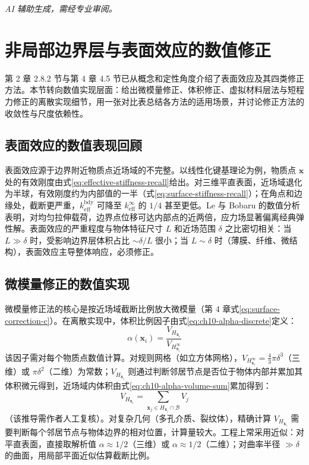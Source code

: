 \emph{AI 辅助生成，需经专业审阅。}


\section{非局部边界层与表面效应的数值修正}

第 2 章 2.8.2 节与第 4 章 4.5 节已从概念和定性角度介绍了表面效应及其四类修正方法。本节转向数值实现层面：给出微模量修正、体积修正、虚拟材料层法与短程力修正的离散实现细节，用一张对比表总结各方法的适用场景，并讨论修正方法的收敛性与尺度依赖性。

\subsection{表面效应的数值表现回顾}

表面效应源于边界附近物质点近场域的不完整。以线性化键基理论为例，物质点 $\mathbf{x}$ 处的有效刚度由式\eqref{eq:effective-stiffness-recall}给出。对三维平直表面，近场域退化为半球，有效刚度约为内部值的一半（式\eqref{eq:surface-stiffness-recall}）；在角点和边缘处，截断更严重，$k_{\text{eff}}^{\text{bdy}}$ 可降至 $k_{\text{eff}}^{\infty}$ 的 $1/4$ 甚至更低。Le 与 Bobaru \cite{LeBobaru2018} 的数值分析表明，对均匀拉伸载荷，边界点位移可达内部点的近两倍，应力场显著偏离经典弹性解。表面效应的严重程度与物体特征尺寸 $L$ 和近场范围 $\delta$ 之比密切相关：当 $L\gg\delta$ 时，受影响边界层体积占比 $\sim\delta/L$ 很小；当 $L\sim\delta$ 时（薄膜、纤维、微结构），表面效应主导整体响应，必须修正。

\subsection{微模量修正的数值实现}

微模量修正法的核心是按近场域截断比例放大微模量（第 4 章式\eqref{eq:surface-correction-c}）。在离散实现中，体积比例因子由式\eqref{eq:ch10-alpha-discrete}定义：
\begin{equation}
\alpha(\mathbf{x}_{i}) = \frac{V_{H_{\mathbf{x}_{i}}}}{V_{H_{\mathbf{x}_{i}}^{\infty}}}
\label{eq:ch10-alpha-discrete}
\end{equation}
该因子需对每个物质点数值计算。对规则网格（如立方体网格），$V_{H_{\mathbf{x}_{i}}^{\infty}}=\frac{4}{3}\pi\delta^{3}$（三维）或 $\pi\delta^{2}$（二维）为常数；$V_{H_{\mathbf{x}_{i}}}$ 则通过判断邻居节点是否位于物体内部并累加其体积微元得到，近场域内体积由式\eqref{eq:ch10-alpha-volume-sum}累加得到：
\begin{equation}
V_{H_{\mathbf{x}_{i}}} = \sum_{\mathbf{x}_{j}\in H_{\mathbf{x}_{i}}\cap\mathcal{B}} V_{j}
\label{eq:ch10-alpha-volume-sum}
\end{equation}
（该推导需作者人工复核）。对复杂几何（多孔介质、裂纹体），精确计算 $V_{H_{\mathbf{x}_{i}}}$ 需要判断每个邻居节点与物体边界的相对位置，计算量较大。工程上常采用近似：对平直表面，直接取解析值 $\alpha\approx 1/2$（三维）或 $\alpha\approx 1/2$（二维）；对曲率半径 $\gg\delta$ 的曲面，用局部平面近似估算截断比例。

